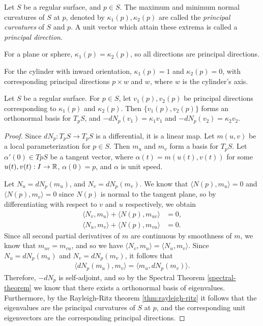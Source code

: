 \begin{defn}
    Let $S$ be a regular surface, and $p \in S$. The maximum and minimum normal curvatures of $S$ at $p$, denoted by $\kappa_1(p), \kappa_2(p)$ are called the \emph{principal curvatures} of $S$ and $p$. A unit vector which attain these extrema is called a \emph{principal direction}.
\end{defn}

\begin{exmp}
    For a plane or sphere, $\kappa_1(p) = \kappa_2(p)$, so all directions are principal directions.

    For the cylinder with inward orientation, $\kappa_1(p) = 1$ and $\kappa_2(p) = 0$, with corresponding principal directions $p \times w$ and $w$, where $w$ is the cylinder's axis.
\end{exmp}

\begin{thm}\label{thm:principal-directions-gauss-eigenvectors}
    Let $S$ be a regular surface. For $p \in S$, let $v_1(p), v_2(p)$ be principal directions corresponding to $\kappa_1(p)$ and $\kappa_2(p)$. Then $\{v_1(p), v_2(p)\}$ forms an orthonormal basis for $T_pS$, and $-dN_p(v_1) = \kappa_1v_1$ and $-dN_p(v_2) = \kappa_2v_2$.
\end{thm}

\begin{proof}
    Since $dN_{p}: T_pS \to T_pS$ is a differential, it is a linear map. Let $m(u, v)$ be a local parameterization for $p \in S$. Then $m_{u}$ and $m_{v}$ form a basis for $T_pS$. Let $\alpha'(0) \in TpS$ be a tangent vector, where $\alpha(t) = m(u(t), v(t))$ for some $u(t), v(t): I \to \mathbb{R}$, $\alpha(0) = p$, and $\alpha$ is unit speed.
    
    Let $N_u = dN_{p}(m_u)$, and $N_v = dN_{p}(m_v)$. We know that $\langle N(p), m_u \rangle = 0$ and $\langle N(p), m_v\rangle = 0$ since $N(p)$ is normal to the tangent plane, so by differentiating with respect to $v$ and $u$ respectively, we obtain
    \begin{align*}
        \langle N_v, m_u \rangle + \langle N(p), m_{uv}\rangle &= 0, \\
        \langle N_u, m_v \rangle + \langle N(p), m_{vu}\rangle &= 0.
    \end{align*}
    Since all second partial derivatives of $m$ are continuous by smoothness of $m$, we know that $m_{uv} = m_{vu}$, and so we have $\langle N_v, m_u\rangle = \langle N_u, m_v \rangle$. Since $N_u = dN_{p}(m_u)$ and $N_v = dN_{p}(m_v)$, it follows that
    \begin{align*}
        \langle dN_{p}(m_u), m_v \rangle = \langle m_u, dN_{p}(m_v)\rangle.
    \end{align*}
    Therefore, $-dN_{p}$ is self-adjoint, and so by the Spectral Theorem \ref{spectral-theorem} we know that there exists a orthonormal basis of eigenvalues. Furthermore, by the Rayleigh-Ritz theorem \ref{thm:rayleigh-ritz} it follows that the eigenvalues are the principal curvatures of $S$ at $p$, and the corresponding unit eigenvectors are the corresponding principal directions.
\end{proof}

